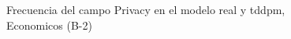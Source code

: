 \begin{figure}[H]
    \centering
    
    \caption{Frecuencia del campo Privacy en el modelo real y tddpm, Economicos (B-2)}
    \label{frecuency-Privacy-tddpm_mlp}
\end{figure}